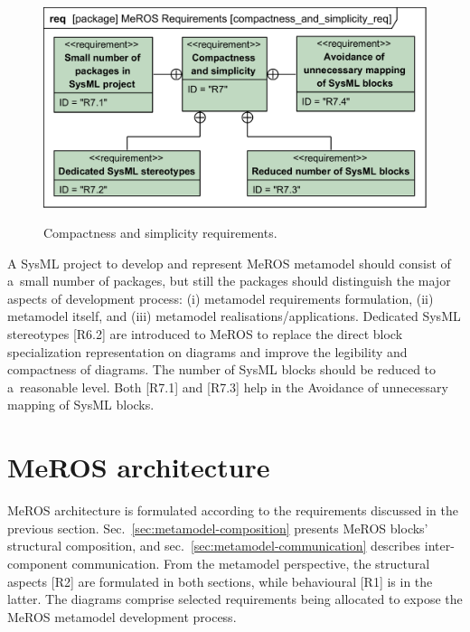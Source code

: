 \documentclass[11pt,oneside,a4paper]{report}
\begin{document}
	\begin{figure}[H]
		\centering
		\begin{center}
			{\includegraphics[scale=1.0]{diagrams/compactness_and_simplicity_req.png}}
		\end{center}
		\caption{Compactness and simplicity requirements.} 
		\label{fig:compactness_and_simplicity_req}
	\end{figure}
	
	A SysML project to develop and represent MeROS metamodel should consist of a~small number of packages, but still the packages should distinguish the major aspects of development process: (i) metamodel requirements formulation, (ii) metamodel itself, and (iii) metamodel realisations/applications.
	Dedicated SysML stereotypes [R6.2] are introduced to MeROS to replace the direct block specialization representation on diagrams and improve the legibility and compactness of diagrams.
	The number of SysML blocks should be reduced to a~reasonable level. Both [R7.1] and [R7.3] help in the Avoidance of unnecessary mapping of SysML blocks.

	
	
\chapter{MeROS architecture}
\label{ch:architecture}

	MeROS architecture is formulated according to the requirements discussed in the previous section. Sec.~\ref{sec:metamodel-composition} presents MeROS blocks' structural composition, and sec.~\ref{sec:metamodel-communication} describes inter-component communication. From the metamodel perspective, the structural aspects [R2] are formulated in both sections, while behavioural [R1] is in the latter. The diagrams comprise selected requirements being allocated to expose the MeROS metamodel development process. 
	
\end{document}
